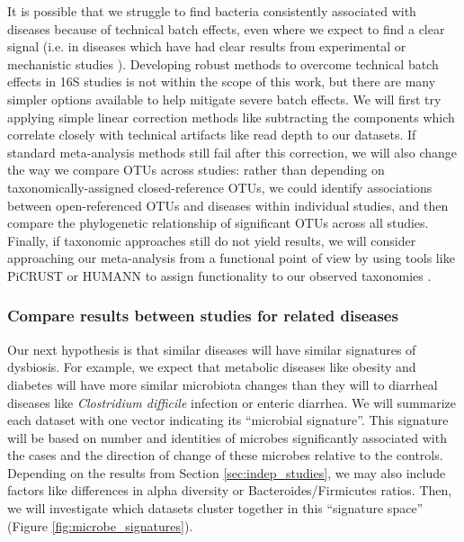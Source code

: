 \documentclass[12pt]{article}
\begin{document}
It is possible that we struggle to find bacteria consistently 
associated with diseases because of technical batch effects, even 
where we expect to find a clear signal (i.e. in diseases which have 
had clear results from experimental or mechanistic studies \cite{turnbaugh-energy_harvest-2006, ridaura-mouse_fmt-2013, crc_zeller}). 
Developing robust methods to overcome technical batch effects in 16S 
studies is not within the scope of this work, but there are many
simpler options available to help mitigate severe batch effects. 
We will first try applying simple linear correction methods 
like subtracting the components which correlate closely with technical 
artifacts like read depth to our datasets. 
If standard meta-analysis methods still fail after this correction, we will also 
change the way we compare OTUs across studies:
rather than depending on taxonomically-assigned closed-reference OTUs, 
we could identify associations between open-referenced OTUs and 
diseases within individual studies, and then compare 
the phylogenetic relationship of significant OTUs across all studies. Finally, 
if taxonomic approaches still do not yield results, we will consider
approaching our meta-analysis from a functional point of view by
using tools like PiCRUST or HUMANN to assign functionality to our
observed taxonomies \cite{langille-picrust-2013, abubucker-humann-2012}.

\subsubsection{Compare results between studies for related diseases}\label{sec:signatures}
Our next hypothesis is that similar diseases will have similar 
signatures of dysbiosis. For example, we expect that metabolic 
diseases like obesity and diabetes will have more similar microbiota 
changes than they will to diarrheal diseases like \textit{Clostridium 
difficile} infection or enteric diarrhea. We will summarize each 
dataset with one vector indicating its ``microbial signature''. This 
signature will be based on number and identities of microbes 
significantly associated with the cases and the direction of change 
of these microbes relative to the controls. Depending on the results from Section 
\ref{sec:indep_studies}, we may also include factors like differences 
in alpha diversity or Bacteroides/Firmicutes ratios. Then, we will 
investigate which datasets cluster together in this ``signature space'' 
(Figure \ref{fig:microbe_signatures}).
\end{document}
